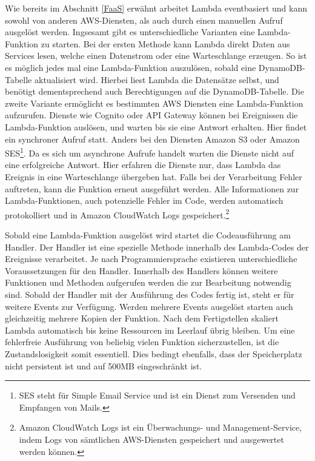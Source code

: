 {Wie bereits im Abschnitt \frqq \ref{FaaS}  \flqq{} erwähnt arbeitet Lambda eventbasiert und kann sowohl von anderen AWS-Diensten, als auch durch einen manuellen Aufruf ausgelöst werden.
Ingsesamt gibt es unterschiedliche Varianten eine Lambda-Funktion zu starten.
Bei der ersten Methode kann Lambda direkt Daten aus Services lesen, welche einen Datenstrom oder eine Warteschlange erzeugen.
So ist es möglich jedes mal eine Lambda-Funktion auszulösen, sobald eine DynamoDB-Tabelle aktualisiert wird.
Hierbei liest Lambda die Datensätze selbst, und benötigt dementsprechend auch Berechtigungen auf die DynamoDB-Tabelle.\cite[]{LambdaDynamo}
Die zweite Variante ermöglicht es bestimmten AWS Diensten eine Lambda-Funktion aufzurufen.
Dienste wie Cognito oder API Gateway können bei Ereignissen die Lambda-Funktion auslösen, und warten bis sie eine Antwort erhalten.
Hier findet ein synchroner Aufruf statt.
Anders bei den Diensten Amazon S3 oder Amazon SES\footnote{SES steht für Simple Email Service und ist ein Dienst zum Versenden und Empfangen von Mails.}. Da es sich um asynchrone Aufrufe handelt warten die Dienste nicht auf eine erfolgreiche Antwort.
Hier erfahren die Dienste nur, dass Lambda das Ereignis in eine Warteschlange übergeben hat.
Falls bei der Verarbeitung Fehler auftreten, kann die Funktion erneut ausgeführt werden.
Alle Informationen zur Lambda-Funktionen, auch potenzielle Fehler im Code, werden automatisch protokolliert und in Amazon CloudWatch Logs gespeichert.\footnote{ Amazon CloudWatch Logs ist ein Überwachungs- und Management-Service, indem Logs von sämtlichen AWS-Diensten gespeichert und ausgewertet werden können. }
\cite[]{LambdaDienste}

Sobald eine Lambda-Funktion ausgelöst wird startet die Codeausführung am Handler.
Der Handler ist eine spezielle Methode innerhalb des Lambda-Codes der Ereignisse verarbeitet.
Je nach Programmiersprache existieren unterschiedliche Voraussetzungen für den Handler.
Innerhalb des Handlers können weitere Funktionen und Methoden aufgerufen werden die zur Bearbeitung notwendig sind.
Sobald der Handler mit der Ausführung des Codes fertig ist, steht er für weitere Events zur Verfügung.
Werden mehrere Events ausgelöst starten auch gleichzeitig mehrere Kopien der Funktion.
Nach dem Fertigstellen skaliert Lambda automatisch bis keine Ressourcen im Leerlauf übrig bleiben.
Um eine fehlerfreie Ausführung von beliebig vielen Funktion sicherzustellen, ist die Zustandslosigkeit somit essentiell.
Dies bedingt ebenfalls, dass der Speicherplatz nicht persistent ist und auf 500MB eingeschränkt ist.\cite[]{AWSWhitepaper}

}

